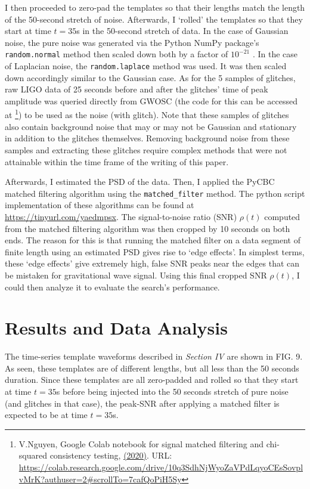 \documentclass[preprint,
letterpaper,
 amsmath,amssymb,
 aps,
]{revtex4-2}
\def\code#1{\texttt{#1}}
\begin{document}
I then proceeded to zero-pad the templates so that their lengths match the length of the 50-second stretch of noise. Afterwards, I `rolled' the templates so that they start at time $t=35$s in the 50-second stretch of data. In the case of Gaussian noise, the pure noise was generated via the Python NumPy package's \code{random.normal} method then scaled down both by a factor of $10^{-21}$ \cite{numpy}. In the case of Laplacian noise, the \code{random.laplace} method was used. It was then scaled down accordingly similar to the Gaussian case. As for the 5 samples of glitches, raw LIGO data of 25 seconds before and after the glitches' time of peak amplitude was queried directly from GWOSC (the code
for this can be accessed at \footnote{V.Nguyen, Google Colab notebook for signal matched filtering and chi-squared consistency testing, \href{https://colab.research.google.com/drive/10q3SdhNjWyoZaVPdLqyoCEsSovplvMrK?authuser=2#scrollTo=7cafQoPiH5Sy}{(2020)}. URL: \url{https://colab.research.google.com/drive/10q3SdhNjWyoZaVPdLqyoCEsSovplvMrK?authuser=2#scrollTo=7cafQoPiH5Sy}}) to be used as the noise (with glitch). Note that these samples of glitches also contain background noise that may or may not be Gaussian and stationary in addition to the glitches themselves. Removing background noise from these samples and extracting these glitches require complex methods that were not attainable within the time frame of the writing of this paper. 

Afterwards, I estimated the PSD of the data. Then, I applied the PyCBC matched filtering algorithm using the \code{matched\_filter} method. The python script implementation of these algorithms can be found at \url{https://tinyurl.com/yaedmpsx}. The signal-to-noise ratio (SNR) $\rho (t)$ computed from the matched filtering algorithm was then cropped by 10 seconds on both ends. The reason for this is that running the matched filter on a data segment of finite length using an estimated PSD gives rise to `edge effects'. In simplest terms, these `edge effects' give extremely high, false SNR peaks near the edges that can be mistaken for gravitational wave signal. Using this final cropped SNR $\rho(t)$, I could then analyze it to evaluate the search's performance.

\section{Results and Data Analysis}
The time-series template waveforms described in \textit{Section IV} are shown in FIG. 9. As seen, these templates are of different lengths, but all less than the 50 seconds duration. Since these templates are all zero-padded and rolled so that they start at time $t=35$s before being injected into the 50 seconds stretch of pure noise (and glitches in that case), the peak-SNR after applying a matched filter is expected to be at time $t=35$s.
\end{document}
